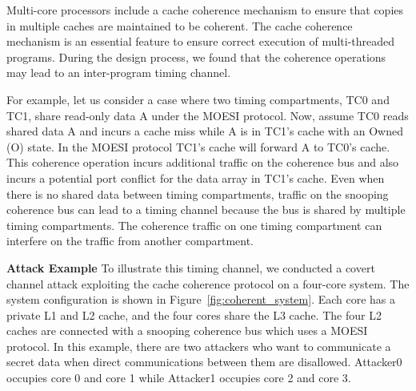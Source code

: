 Multi-core processors include a cache coherence mechanism to ensure that
copies in multiple caches are maintained to be coherent.
The cache coherence mechanism is an essential feature to ensure correct
execution of multi-threaded programs.
During the design process, we found that the coherence operations may lead
to an inter-program timing channel.


For example, let us consider a case where two timing compartments, TC0 and TC1, 
share read-only data A under the MOESI protocol.
Now, assume TC0 
reads shared data A and incurs a cache miss while A is in TC1's cache with 
an Owned (O) state. In the MOESI protocol
TC1's cache will forward A to TC0's cache.
This coherence operation incurs additional traffic on the coherence bus and also
incurs a potential port conflict for the data array in TC1's cache.
Even when there is no shared data between 
timing compartments, traffic on the snooping coherence bus can lead to
a timing channel because the bus is shared by multiple timing compartments.
The coherence traffic on one timing compartment can 
interfere on the traffic from another compartment.

{\bf Attack Example}
To illustrate this timing channel,
we conducted a covert channel attack exploiting the cache coherence 
protocol on a four-core system.  The system configuration is shown in 
Figure~\ref{fig:coherent_system}. Each core has a private L1 and L2 cache, and 
the four cores share
the L3 cache. The four L2 caches are connected with a snooping coherence bus which uses a 
MOESI protocol.  In this example, there are two attackers who
want to communicate a secret data when direct communications between them are 
disallowed. 
Attacker0 occupies core 0 and core 1 while Attacker1 occupies core 2 and
core 3. 

